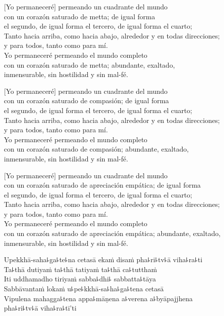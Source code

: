 [Yo permaneceré] permeando un cuadrante del mundo\\
\vin con un corazón saturado de metta; de igual forma\\
\vin el segundo, de igual forma el tercero, de igual forma el cuarto;\\
Tanto hacia arriba, como hacia abajo, alrededor y en todas direcciones;\\
\vin y para todos, tanto como para mí.\\
Yo permaneceré permeando el mundo completo\\
\vin con un corazón saturado de metta; abundante, exaltado,\\
\vin inmensurable, sin hostilidad y sin mal-fé.

[Yo permaneceré] permeando un cuadrante del mundo\\
\vin con un corazón saturado de compasión; de igual forma\\
\vin el segundo, de igual forma el tercero, de igual forma el cuarto;\\
Tanto hacia arriba, como hacia abajo, alrededor y en todas direcciones;\\
\vin y para todos, tanto como para mí.\\
Yo permaneceré permeando el mundo completo\\
\vin con un corazón saturado de compasión; abundante, exaltado,\\
\vin inmensurable, sin hostilidad y sin mal-fé.

[Yo permaneceré] permeando un cuadrante del mundo\\
\vin con un corazón saturado de apreciación empática; de igual forma\\
\vin el segundo, de igual forma el tercero, de igual forma el cuarto;\\
Tanto hacia arriba, como hacia abajo, alrededor y en todas direcciones;\\
\vin y para todos, tanto como para mí.\\
Yo permaneceré permeando el mundo completo\\
\vin con un corazón saturado de apreciación empática; abundante, \vin exaltado,
inmensurable, sin hostilidad y sin mal-fé.

\clearpage

Upekkhā-saha꜕ga꜕te꜕na cetasā ekaṁ disaṁ pha꜕ri꜕tv꜕ā viha꜕ra꜕ti\\
Ta꜕thā dutiyaṁ ta꜕thā tatiyaṁ ta꜕thā ca꜕tutthaṁ\\
Iti uddhamadho tiriyaṁ sabba꜕dhi꜕ sabbatta꜕tāya\\
Sabbāvantaṁ lokaṁ u꜕pe꜕kkhā-sa꜕ha꜕ga꜕tena cetasā\\
Vipulena mahagga꜕tena appa꜕māṇena a꜕verena a꜕byāpajjhena\\
\vin pha꜕ri꜕tv꜕ā viha꜕ra꜕tī'ti

